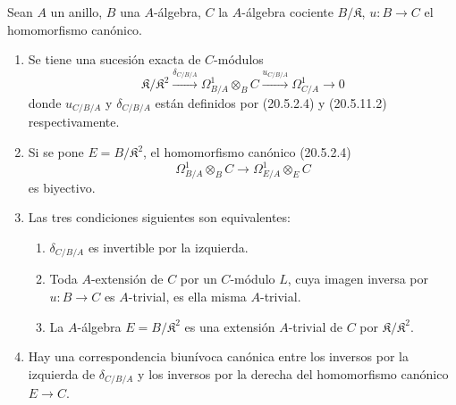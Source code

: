 \begin{theorem}[20.5.12]
\label{0.20.5.12-fr}
Sean $A$ un anillo, $B$ una $A$-álgebra, $C$ la $A$-álgebra cociente
$B/\mathfrak{K}$, $u:B\to C$ el homomorfismo canónico.
\begin{enumerate}
  \item[\rm(i)] Se tiene una sucesión exacta de $C$-módulos
\begin{equation}
\tag{20.5.12.1}
\label{0.20.5.12.1-fr}
  \mathfrak{K}/\mathfrak{K}^2
  \xrightarrow{\delta_{C/B/A}}\Omega^1_{B/A}\otimes_B C
  \xrightarrow{u_{C/B/A}}\Omega^1_{C/A}\longrightarrow 0
\end{equation}
donde $u_{C/B/A}$ y $\delta_{C/B/A}$ están definidos por (20.5.2.4) y
(20.5.11.2) respectivamente.
  \item[\rm(ii)] Si se pone $E=B/\mathfrak{K}^2$, el homomorfismo
canónico (20.5.2.4)
\[
  \Omega^1_{B/A}\otimes_B C\longrightarrow
  \Omega^1_{E/A}\otimes_E C
\]
es biyectivo.
  \item[\rm(iii)] Las tres condiciones siguientes son equivalentes:
  \begin{enumerate}
    \item[\rm a)] $\delta_{C/B/A}$ es invertible por la izquierda.
    \item[\rm b)] Toda $A$-extensión de $C$ por un $C$-módulo $L$, cuya
imagen inversa por $u:B\to C$ es $A$-trivial, es ella misma
$A$-trivial.
    \item[\rm c)] La $A$-álgebra $E=B/\mathfrak{K}^2$ es una extensión
$A$-trivial de $C$ por $\mathfrak{K}/\mathfrak{K}^2$.
  \end{enumerate}
  
\item[\rm(iv)] Hay una correspondencia biunívoca canónica entre los
inversos por la izquierda de $\delta_{C/B/A}$ y los inversos por la derecha del
homomorfismo canónico $E\to C$.
\end{enumerate}
\end{theorem}

